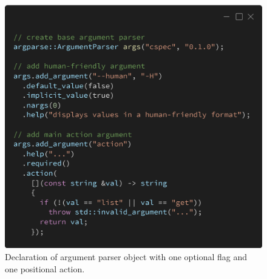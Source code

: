 \documentclass[conference]{IEEEtran}
\begin{document}
\begin{figure}[!t]
    \centering
    \includegraphics[width=\linewidth]{fig-argparse}
    \caption{Declaration of argument parser object with one optional flag and one positional action.}
    \label{fig-argparse}
\end{figure}
\end{document}
